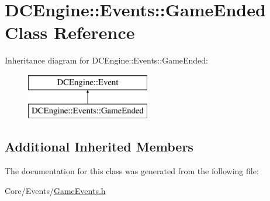 \hypertarget{classDCEngine_1_1Events_1_1GameEnded}{\section{D\-C\-Engine\-:\-:Events\-:\-:Game\-Ended Class Reference}
\label{classDCEngine_1_1Events_1_1GameEnded}
}
Inheritance diagram for D\-C\-Engine\-:\-:Events\-:\-:Game\-Ended\-:\begin{figure}[H]
\begin{center}
\leavevmode
\includegraphics[height=2.000000cm]{classDCEngine_1_1Events_1_1GameEnded}
\end{center}
\end{figure}
\subsection*{Additional Inherited Members}


The documentation for this class was generated from the following file\-:\begin{DoxyCompactItemize}
\item 
Core/\-Events/\hyperlink{GameEvents_8h}{Game\-Events.\-h}\end{DoxyCompactItemize}
